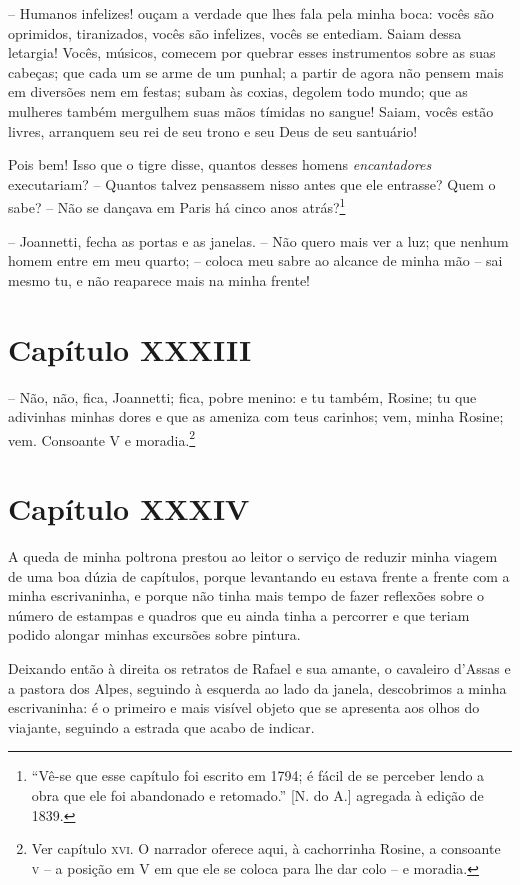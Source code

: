  -- Humanos infelizes! ouçam a verdade que lhes fala pela minha boca:
vocês são oprimidos, tiranizados, vocês são infelizes, vocês se
entediam. Saiam dessa letargia! Vocês, músicos, comecem por quebrar
esses instrumentos sobre as suas cabeças; que cada um se arme de um
punhal; a partir de agora não pensem mais em diversões nem em festas;
subam às coxias, degolem todo mundo; que as mulheres também mergulhem
suas mãos tímidas no sangue! Saiam, vocês estão livres, arranquem seu
rei de seu trono e seu Deus de seu santuário!

 Pois bem! Isso que o tigre disse, quantos desses homens
\textit{encantadores} executariam? -- Quantos talvez pensassem nisso
antes que ele entrasse? Quem o sabe? -- Não se dançava em Paris há
cinco anos atrás?\footnote{ ``Vê-se que esse capítulo foi escrito em
1794; é fácil de se perceber lendo a obra que ele foi abandonado e
retomado.'' [N. do A.] agregada à edição de 1839.}

 -- Joannetti, fecha as portas e as janelas. -- Não quero mais ver a
luz; que nenhum homem entre em meu quarto; -- coloca meu sabre ao
alcance de minha mão -- sai mesmo tu, e não reaparece mais na minha
frente!

\section{Capítulo XXXIII}

 -- Não, não, fica, Joannetti; fica, pobre menino: e tu também, Rosine;
tu que adivinhas minhas dores e que as ameniza com teus carinhos; vem,
minha Rosine; vem. Consoante V e moradia.\footnote{ Ver capítulo \textsc{xvi}. O
narrador oferece aqui, à cachorrinha Rosine, a consoante \textsc{v} -- a
posição em V em que ele se coloca para lhe dar colo -- e moradia.} 

\section{Capítulo XXXIV}

 A queda de minha poltrona prestou ao leitor o serviço de reduzir minha
viagem de uma boa dúzia de capítulos, porque levantando eu estava
frente a frente com a minha escrivaninha, e porque não tinha mais tempo
de fazer reflexões sobre o número de estampas e quadros que eu ainda
tinha a percorrer e que teriam podido alongar minhas excursões sobre pintura.

 Deixando então à direita os retratos de Rafael e sua amante, o
cavaleiro d’Assas e a pastora dos Alpes, seguindo à esquerda ao lado da
janela, descobrimos a minha escrivaninha: é o primeiro e mais visível
objeto que se apresenta aos olhos do viajante, seguindo a estrada que
acabo de indicar.

